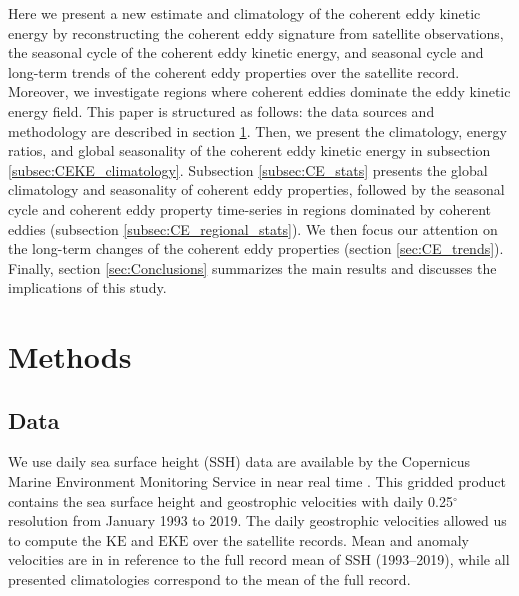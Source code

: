 \documentclass[draft,linenumbers]{agujournal2019}
\newcommand{\KE}{\textrm{KE}}
\newcommand{\EKE}{\textrm{EKE}}
\begin{document}
Here we present a new estimate and climatology of the coherent eddy kinetic energy by reconstructing the coherent eddy signature from satellite observations, the seasonal cycle of the coherent eddy kinetic energy, and seasonal cycle and long-term trends of the coherent eddy properties over the satellite record. 
Moreover, we investigate regions where coherent eddies dominate the eddy kinetic energy field. 
This paper is structured as follows:  the data sources and methodology are described in section \ref{sec:Methods}.
Then, we present the climatology, energy ratios, and global seasonality of the coherent eddy kinetic energy in subsection \ref{subsec:CEKE_climatology}. 
Subsection \ref{subsec:CE_stats} presents the global climatology and seasonality of coherent eddy properties, followed by the seasonal cycle and coherent eddy property time-series in regions dominated by coherent eddies (subsection \ref{subsec:CE_regional_stats}). 
We then focus our attention on the long-term changes of the coherent eddy properties (section \ref{sec:CE_trends}). 
Finally, section \ref{sec:Conclusions} summarizes the main results and discusses the implications of this study.

\section{Methods}
\label{sec:Methods}
	\subsection{Data}
	We use daily sea surface height (SSH) data are available by the Copernicus Marine Environment Monitoring Service in near real time \citep{CMEMS_aviso_2017}. This gridded product contains the sea surface height and geostrophic velocities with daily 0.25$^\circ$ resolution from January 1993 to 2019. The daily geostrophic velocities allowed us to compute the $\KE$ and $\EKE$ over the satellite records. Mean and anomaly velocities are in  in reference to the full record mean of SSH (1993–2019), while all presented climatologies correspond to the mean of the full record.
	
\end{document}
